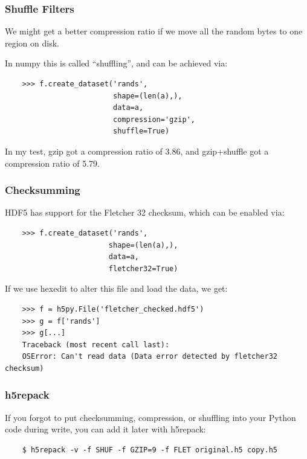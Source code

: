 \documentclass[9pt]{beamer}
\begin{document}
\begin{frame}[fragile]
  \frametitle{Shuffle Filters}
  We might get a better compression ratio if we move all the random bytes to one region on disk.

  In numpy this is called ``shuffling'', and can be achieved via:
  \begin{verbatim}
    >>> f.create_dataset('rands',
                         shape=(len(a),),
                         data=a,
                         compression='gzip',
                         shuffle=True)
  \end{verbatim}
  In my test, gzip got a compression ratio of 3.86, and gzip+shuffle got a compression ratio of 5.79.    
\end{frame}

\begin{frame}[fragile]
  \frametitle{Checksumming}
  HDF5 has support for the Fletcher 32 checksum, which can be enabled via:
  \begin{verbatim}
    >>> f.create_dataset('rands',
                        shape=(len(a),),
                        data=a,
                        fletcher32=True)
  \end{verbatim}
  If we use hexedit to alter this file and load the data, we get:
  \begin{verbatim}
    >>> f = h5py.File('fletcher_checked.hdf5')
    >>> g = f['rands']
    >>> g[...]
    Traceback (most recent call last):
    OSError: Can't read data (Data error detected by fletcher32 checksum)
  \end{verbatim}
\end{frame}

\begin{frame}[fragile]
  \frametitle{h5repack}
  If you forgot to put checksumming, compression, or shuffling into your Python code during write, you can add it later with h5repack:
  \begin{verbatim}
    $ h5repack -v -f SHUF -f GZIP=9 -f FLET original.h5 copy.h5
  \end{verbatim}
\end{frame}
\end{document}
